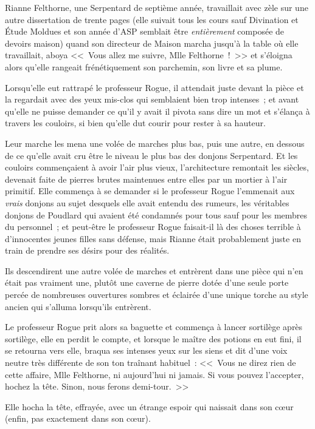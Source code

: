 \later

Rianne Felthorne, une Serpentard de septième année, travaillait avec zèle sur une autre dissertation de trente pages (elle suivait tous les cours sauf Divination et Étude Moldues et son année d'ASP semblait être \emph{entièrement} composée de devoirs maison) quand son directeur de Maison marcha jusqu'à la table où elle travaillait, aboya <<~Vous allez me suivre, Mlle Felthorne~!~>> et s'éloigna alors qu'elle rangeait frénétiquement son parchemin, son livre et sa plume.

Lorsqu'elle eut rattrapé le professeur Rogue, il attendait juste devant la pièce et la regardait avec des yeux mis-clos qui semblaient bien trop intenses~; et avant qu'elle ne puisse demander ce qu'il y avait il pivota sans dire un mot et s'élança à travers les couloirs, si bien qu'elle dut courir pour rester à sa hauteur.

Leur marche les mena une volée de marches plus bas, puis une autre, en dessous de ce qu'elle avait cru être le niveau le plus bas des donjons Serpentard. Et les couloirs commençaient à avoir l'air plus vieux, l'architecture remontait les siècles, devenait faite de pierres brutes maintenues entre elles par un mortier à l'air primitif. Elle commença à se demander si le professeur Rogue l'emmenait aux \emph{vrais} donjons au sujet desquels elle avait entendu des rumeurs, les véritables donjons de Poudlard qui avaient été condamnés pour tous sauf pour les membres du personnel~; et peut-être le professeur Rogue faisait-il là des choses terrible à d'innocentes jeunes filles sans défense, mais Rianne était probablement juste en train de prendre ses désirs pour des réalités.

Ils descendirent une autre volée de marches et entrèrent dans une pièce qui n'en était pas vraiment une, plutôt une caverne de pierre dotée d'une seule porte percée de nombreuses ouvertures sombres et éclairée d'une unique torche au style ancien qui s'alluma lorsqu'ils entrèrent.

Le professeur Rogue prit alors sa baguette et commença à lancer sortilège après sortilège, elle en perdit le compte, et lorsque le maître des potions en eut fini, il se retourna vers elle, braqua ses intenses yeux sur les siens et dit d'une voix neutre très différente de son ton traînant habituel~: <<~Vous ne direz rien de cette affaire, Mlle Felthorne, ni aujourd'hui ni jamais. Si vous pouvez l'accepter, hochez la tête. Sinon, nous ferons demi-tour.~>>

Elle hocha la tête, effrayée, avec un étrange espoir qui naissait dans son cœur (enfin, pas exactement dans son cœur).

